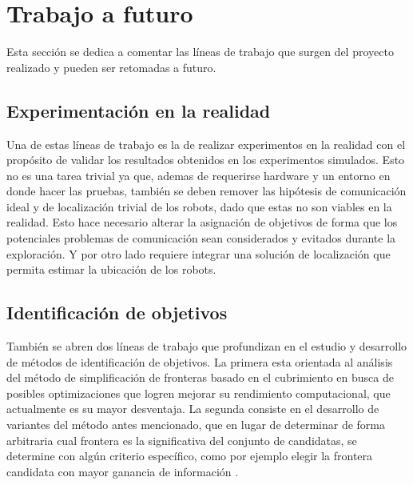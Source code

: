 
\section{Trabajo a futuro}

Esta sección se dedica a comentar las líneas de trabajo que surgen del proyecto
realizado y pueden ser retomadas a futuro.

\subsection{Experimentación en la realidad}

Una de estas líneas de trabajo es la de realizar experimentos en la realidad
con el propósito de validar los resultados obtenidos en los experimentos
simulados. Esto no es una tarea trivial ya que, ademas de requerirse hardware y
un entorno en donde hacer las pruebas, también se deben remover las hipótesis de
comunicación ideal y de localización trivial de los robots, dado que estas
no son viables en la realidad. Esto hace necesario alterar la
asignación de objetivos de forma que los potenciales problemas de comunicación
sean considerados y evitados durante la exploración. Y por otro lado requiere
integrar una solución de localización que permita estimar la ubicación de los
robots.%

\subsection{Identificación de objetivos}


También se abren dos líneas de trabajo que profundizan en el estudio y
desarrollo de métodos de identificación de objetivos. La primera esta orientada
al análisis del método de simplificación de fronteras basado en el cubrimiento
en busca de posibles optimizaciones que logren mejorar su rendimiento
computacional, que actualmente es su mayor desventaja. La segunda consiste en
el desarrollo de variantes del método antes mencionado, que en lugar de
determinar de forma arbitraria cual frontera es la significativa del conjunto
de candidatas, se determine con algún criterio específico, como por ejemplo elegir la
frontera candidata con mayor ganancia de información \cite{Amorin2019}.

